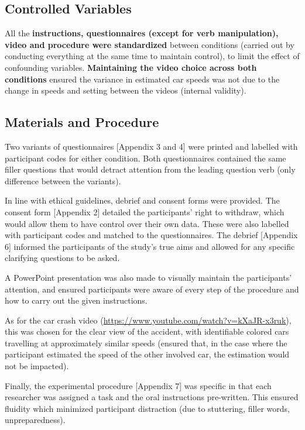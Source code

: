 \documentclass[12pt]{article}
\begin{document}
\subsection{Controlled Variables}
All the \textbf{instructions, questionnaires (except for verb manipulation), video and procedure were standardized} between conditions (carried out by conducting everything at the same time to maintain control), to limit the effect of confounding variables. \textbf{Maintaining the video choice across both conditions} ensured the variance in estimated car speeds was not due to the change in speeds and setting between the videos (internal validity).  

\subsection{Materials and Procedure}
Two variants of questionnaires [Appendix 3 and 4] were printed and labelled with participant codes for either condition. Both questionnaires contained the same filler questions that would detract attention from the leading question verb (only difference between the variants). 

In line with ethical guidelines, debrief and consent forms were provided. The consent form [Appendix 2] detailed the participants' right to withdraw, which would allow them to have control over their own data. These were also labelled with participant codes and matched to the questionnaires. The debrief [Appendix 6] informed the participants of the study's true aims and allowed for any specific clarifying questions to be asked.  

A PowerPoint presentation was also made to visually maintain the participants' attention, and ensured participants were aware of every step of the procedure and how to carry out the given instructions. 

As for the car crash video (\url{https://www.youtube.com/watch?v=kXaJR-x3ruk}), this was chosen for the clear view of the accident, with identifiable colored cars travelling at approximately similar speeds (ensured that, in the case where the participant estimated the speed of the other involved car, the estimation would not be impacted). 

Finally, the experimental procedure [Appendix 7] was specific in that each researcher was assigned a task and the oral instructions pre-written. This ensured fluidity which minimized participant distraction (due to stuttering, filler words, unpreparedness). 
\end{document}
